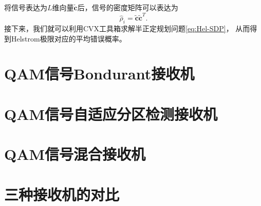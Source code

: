 将信号表达为$L$维向量$\tilde{\bm{c}}$后，信号的密度矩阵可以表达为
\begin{equation}
\hat{\rho}_i = \tilde{\bm{c}} \tilde{\bm{c}}^T.
\end{equation}
接下来，我们就可以利用CVX工具箱求解半正定规划问题\ref{eq:Hel-SDP}，
从而得到Helstrom极限对应的平均错误概率。





\section{QAM信号Bondurant接收机}


\section{QAM信号自适应分区检测接收机}


\section{QAM信号混合接收机}


\section{三种接收机的对比}

